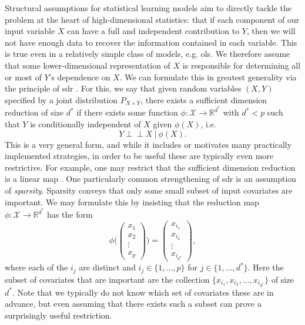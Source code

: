\documentclass[thesis.tex]{subfiles}
\begin{document}
Structural assumptions for statistical learning models aim to directly tackle the problem at the heart of high-dimensional statistics: that if each component of our input variable $X$ can have a full and independent contribution to $Y$, then we will not have enough data to recover the information contained in each variable. This is true even in a relatively simple class of models, e.g. \gls{ols}. We therefore assume that some lower-dimensional representation of $X$ is responsible for determining all or most of $Y$'s dependence on $X$. We can formulate this in greatest generality via the principle of \gls{sdr} \citep{adragni_sufficient_2009}. For this, we say that given random variables $(X,Y)$ specified by a joint distribution $P_{X \times Y}$, there exists a sufficient dimension reduction of size $d^*$ if there exists some function $\phi \colon \mathcal{X} \rightarrow \mathbb{R}^{d^*}$ with $d^* < p$ such that $Y$ is conditionally independent of $X$ given $\phi(X)$, i.e.
\[ Y \perp\!\!\!\perp X \ | \ \phi(X). \]
This is a very general form, and while it includes or motivates many practically implemented strategies, in order to be useful these are typically even more restrictive. For example, one may restrict that the sufficient dimension reduction is a linear map \citep{omidiran_high-dimensional_2010, cannings_random-projection_2017}. One particularly common strengthening of \gls{sdr} is an assumption of \emph{sparsity}. Sparsity conveys that only some small subset of input covariates are important. We may formulate this by insisting that the reduction map $\phi \colon \mathcal{X} \rightarrow \mathbb{R}^{d^*}$ has the form
\[ \phi \big(\begin{pmatrix} x_1 \\ x_2 \\ \vdots \\ x_p\end{pmatrix}\big) = 
\begin{pmatrix} x_{i_1} \\ x_{i_2} \\ \vdots \\ x_{i_{d^*}}    \end{pmatrix},\]
where each of the $i_j$ are distinct and $i_j \in \{ 1, \dots, p\}$ for $j \in \{1, \dots, d^*\}$. Here the subset of covariates that are important are the collection $\{x_{i_1}, x_{i_2}, \dots, x_{i_{d^*}}\}$ of size $d^*$. Note that we typically do not know which set of covariates these are in advance, but even assuming that there exists such a subset can prove a surprisingly useful restriction.
\end{document}

